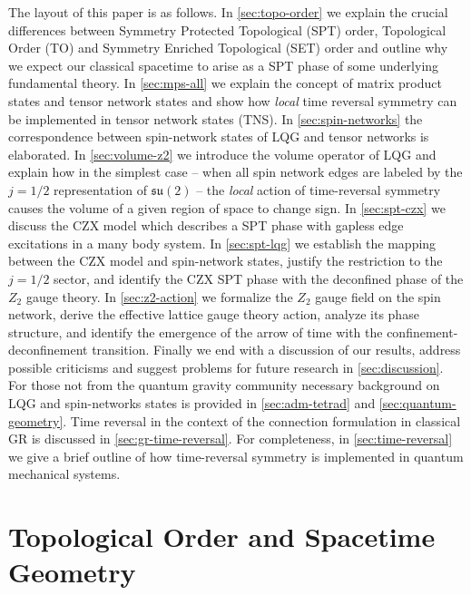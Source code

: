 \documentclass[preprint]{SciPost}
\newcommand{\mf}[1]{\mathfrak{#1}}
\theoremstyle{plain} %
\begin{document}
The layout of this paper is as follows. In \autoref{sec:topo-order} we explain the crucial differences between Symmetry Protected Topological (SPT) order, Topological Order (TO) and Symmetry Enriched Topological (SET) order and outline why we expect our classical spacetime to arise as a SPT phase of some underlying fundamental theory. In \autoref{sec:mps-all} we explain the concept of matrix product states and tensor network states and show how \emph{local} time reversal symmetry can be implemented in tensor network states (TNS). In \autoref{sec:spin-networks} the correspondence between spin-network states of LQG and tensor networks is elaborated. In \autoref{sec:volume-z2} we introduce the volume operator of LQG and explain how in the simplest case -- when all spin network edges are labeled by the $ j=1/2 $ representation of $ \mf{su}(2) $ -- the \emph{local} action of time-reversal symmetry causes the volume of a given region of space to change sign. In \autoref{sec:spt-czx} we discuss the CZX model which describes a SPT phase with gapless edge excitations in a many body system. In \autoref{sec:spt-lqg} we establish the mapping between the CZX model and spin-network states, justify the restriction to the $ j = 1/2 $ sector, and identify the CZX SPT phase with the deconfined phase of the $ Z_2 $ gauge theory. In \autoref{sec:z2-action} we formalize the $ Z_2 $ gauge field on the spin network, derive the effective lattice gauge theory action, analyze its phase structure, and identify the emergence of the arrow of time with the confinement-deconfinement transition. Finally we end with a discussion of our results, address possible criticisms and suggest problems for future research in \autoref{sec:discussion}. For those not from the quantum gravity community necessary background on LQG and spin-networks states is provided in \autoref{sec:adm-tetrad} and \autoref{sec:quantum-geometry}. Time reversal in the context of the connection formulation in classical GR is discussed in \autoref{sec:gr-time-reversal}. For completeness, in \autoref{sec:time-reversal} we give a brief outline of how time-reversal symmetry is implemented in quantum mechanical systems. 

\section{Topological Order and Spacetime Geometry}\label{sec:topo-order}
\end{document}
